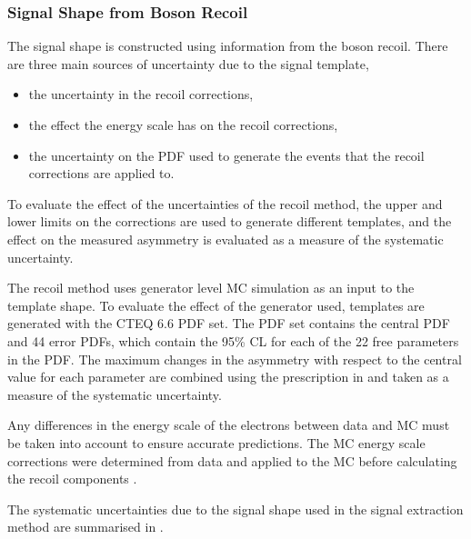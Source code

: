 \subsubsection{Signal \ETm Shape from Boson Recoil}

The signal \ETm shape is constructed using information from the boson recoil.
There are three main sources of uncertainty due to the signal template,

\begin{itemize}
    \item the uncertainty in the recoil corrections,
    \item the effect the energy scale has on the recoil corrections,
    \item the uncertainty on the {PDF} used to generate the events that the
recoil corrections are applied to.
\end{itemize}

To evaluate the effect of the uncertainties of the recoil method, the upper and
lower limits on the corrections are used to generate different templates, and
the effect on the measured asymmetry is evaluated as a measure of the
systematic uncertainty.

The recoil method uses generator level {MC} simulation as an input to the
template shape. 
To evaluate the effect of the generator used, templates are generated with the
CTEQ 6.6 \cite{lai2010vv} PDF set.  The PDF set contains the central PDF and 44
error PDFs, which contain the \unit{95}{\%} {CL} for each of the 22 free
parameters in the {PDF}.
The maximum changes in the asymmetry
with respect to the central value for each parameter are combined using the
prescription in  and taken as a measure of the
systematic uncertainty.

Any differences in the energy scale of the electrons between data and {MC}
must be taken into account to ensure accurate \ETm predictions. The {MC} energy
scale corrections were determined from \PZ data and applied to the \PZ MC
before calculating the recoil components \cite{bauer2010modeling}.

The systematic uncertainties due to the signal \ETm shape used in the signal
extraction method are summarised in .

